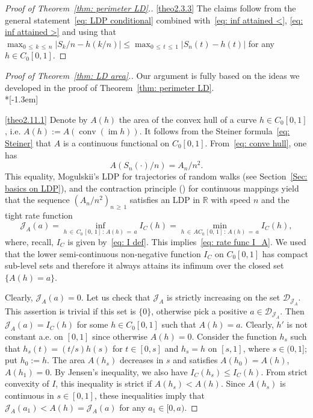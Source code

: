 \documentclass[AHL,Unicode,published]{cedram}
\DeclareMathOperator{\conv}{conv}
\DeclareMathOperator{\im}{im}
\newcommand{\Rbb}{\mathbb{R}}
\newcommand{\Dcl}{\mathcal{D}}
\newcommand{\Jcl}{\mathcal{J}}
\begin{document}
\begin{proof}[Proof of Theorem~\ref{thm: perimeter LD}.]
\eqref{theo2.3.3} The claims follow from the general statement~\eqref{eq: LDP conditional} combined with~\eqref{eq: inf attained <}, \eqref{eq: inf attained >} and using that $\max_{0\,\le\,k\,\le \,n} | S_k/n - h(k/n) | \le \max_{0\,\le\,t\,\le\,1} |S_n(t) - h(t)|$ for any $h \in C_0[0,1]$.\qedhere
\end{proof}

\goodbreak
\begin{proof}[Proof of Theorem~\ref{thm: LD area}.]
Our argument is fully based on the ideas we developed in the proof of Theorem~\ref{thm: perimeter LD}.\ \\*[-1.3em]

\eqref{theo2.11.1} Denote by $A(h)$ the area of the convex hull of a curve $h \in C_0[0,1]$, i.e. $A(h):= A(\conv(\im h))$. It follows from the Steiner formula~\eqref{eq: Steiner} that $A$ is a continuous functional on $C_0[0,1]$. From~\eqref{eq: conve hull}, one has
\[
A(S_n(\cdot)/n)= A_n/n^2.
\]
This equality, Mogulskii's LDP for trajectories of random walks (see Section~\ref{Sec: basics on LDP}), and the contraction principle (\cite[Theorem~4.2.1]{DemboZeitouni}) for continuous mappings yield that the sequence $(A_n/n^2)_{n\,\ge\,1}$ satisfies an LDP in $\Rbb$ with speed $n$ and the tight rate function
\begin{equation}\label{eq: rate function I_A}
\Jcl_A(a)=\inf_{h\,\in\,C_0\,[0,\,1]\,: \, A(h)\,=\,a} I_C(h) = \min_{h\,\in\,AC_0\,[0,\,1]\,:\, A(h)\,=\,a} I_C(h),
\end{equation}
where, recall, $I_C$ is given by~\eqref{eq: I def}. This implies~\eqref{eq: rate func I_A}. We used that the lower semi-continuous non-negative function $I_C$ on $C_0[0,1]$ has compact sub-level sets and therefore it always attains its infimum over the closed set $\{A(h)=a\}$.

Clearly, $\Jcl_A(a)=0$. Let us check that $\Jcl_A$ is strictly increasing on the set $\Dcl_{\Jcl_A}$. This assertion is trivial if this set is $\{0\}$, otherwise pick a positive $a \in \Dcl_{\Jcl_A}$. Then $\Jcl_A(a)=I_C(h)$ for some $h \in C_0[0,1]$ such that $A(h)=a$. Clearly, $h'$ is not constant a.e. on $[0,1]$ since otherwise $A(h)=0$. Consider the function $h_s$ such that $h_s(t)=(t/s)h(s) $ for $t \in [0,s]$ and $h_s=h$ on $[s,1]$, where $s \in (0,1]$; put $h_0:=h$. The area $A(h_s)$ decreases in $s$ and satisfies $A(h_0)=A(h)$, $A(h_1)=0$. By Jensen's inequality, we also have $I_C(h_s) \le I_C(h)$. From strict convexity of $I$, this inequality is strict if $A(h_s) < A(h)$. Since $A(h_s)$ is continuous in $s \in [0,1]$, these inequalities imply that $\Jcl_A(a_1) < A(h) =\Jcl_A(a)$ for any $a_1 \in [0, a)$.


\end{proof}
\end{document}
